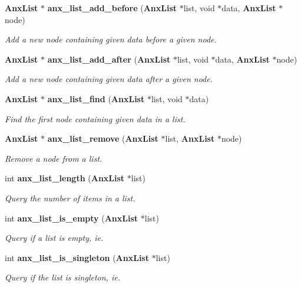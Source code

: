 \begin{CompactItemize}
{\bf Anx\-List} $\ast$ {\bf anx\_\-list\_\-add\_\-before} ({\bf Anx\-List} $\ast$list, void $\ast$data, {\bf Anx\-List} $\ast$node)
\begin{CompactList}\small\item\em Add a new node containing given data before a given node. \item\end{CompactList}\item 
{\bf Anx\-List} $\ast$ {\bf anx\_\-list\_\-add\_\-after} ({\bf Anx\-List} $\ast$list, void $\ast$data, {\bf Anx\-List} $\ast$node)
\begin{CompactList}\small\item\em Add a new node containing given data after a given node. \item\end{CompactList}\item 
{\bf Anx\-List} $\ast$ {\bf anx\_\-list\_\-find} ({\bf Anx\-List} $\ast$list, void $\ast$data)
\begin{CompactList}\small\item\em Find the first node containing given data in a list. \item\end{CompactList}\item 
{\bf Anx\-List} $\ast$ {\bf anx\_\-list\_\-remove} ({\bf Anx\-List} $\ast$list, {\bf Anx\-List} $\ast$node)
\begin{CompactList}\small\item\em Remove a node from a list. \item\end{CompactList}\item 
int {\bf anx\_\-list\_\-length} ({\bf Anx\-List} $\ast$list)
\begin{CompactList}\small\item\em Query the number of items in a list. \item\end{CompactList}\item 
int {\bf anx\_\-list\_\-is\_\-empty} ({\bf Anx\-List} $\ast$list)
\begin{CompactList}\small\item\em Query if a list is empty, ie. \item\end{CompactList}\item 
int {\bf anx\_\-list\_\-is\_\-singleton} ({\bf Anx\-List} $\ast$list)
\begin{CompactList}\small\item\em Query if the list is singleton, ie. \item\end{CompactList}\item 

\end{CompactItemize}
